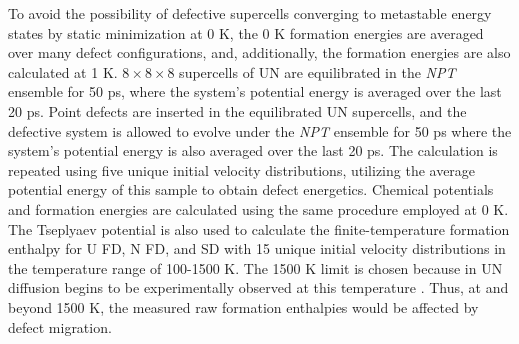 \documentclass[preprint, 12pt]{elsarticle}
\begin{document}
To avoid the possibility of defective supercells converging to metastable energy states by static minimization at 0 K, the 0 K formation energies are averaged over many defect configurations, and, additionally, the formation energies are also calculated at 1 K. $8 \times 8 \times 8$ supercells of UN are equilibrated in the \textit{NPT} ensemble for 50 ps, where the system's potential energy is averaged over the last 20 ps. Point defects are inserted in the equilibrated UN supercells, and the defective system is allowed to evolve under the \textit{NPT} ensemble for 50 ps where the system's potential energy is also averaged over the last 20 ps. The calculation is repeated using five unique initial velocity distributions, utilizing the average potential energy of this sample to obtain defect energetics. Chemical potentials and formation energies are calculated using the same procedure employed at 0 K. The Tseplyaev potential is also used to calculate the finite-temperature formation enthalpy for U FD, N FD, and SD with 15 unique initial velocity distributions in the temperature range of 100-1500 K. The 1500 K limit is chosen because in UN diffusion begins to be experimentally observed at this temperature \cite{Hayes1990III}. Thus, at and beyond 1500 K, the measured raw formation enthalpies would be affected by defect migration.
\end{document}
